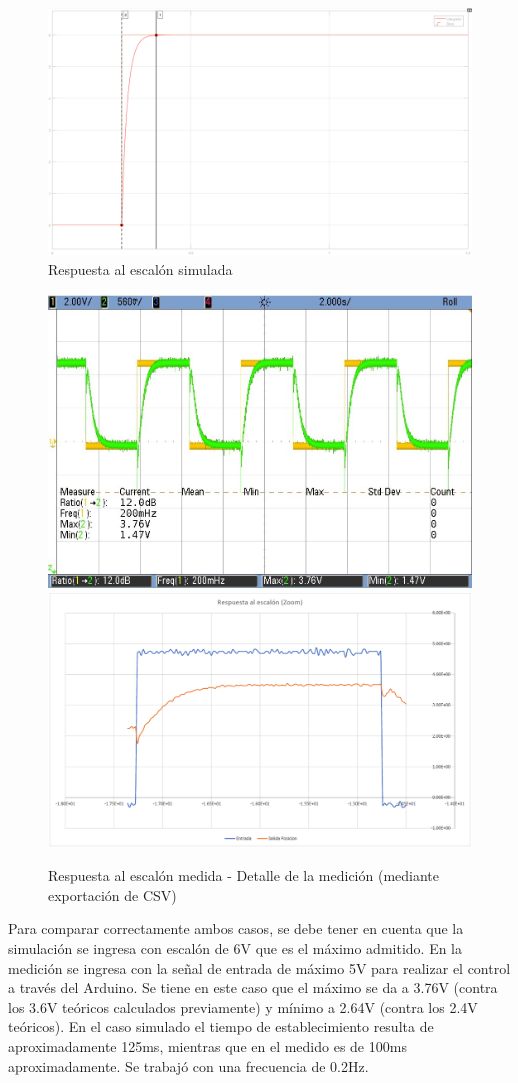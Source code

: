 \documentclass{article}
\begin{document}
\begin{figure}[H]
\centering
\includegraphics[width=0.6\linewidth]{../Images/EscalonSimulado.png}
\caption{Respuesta al escalón simulada}
\end{figure}

\begin{figure}[H]
\centering
\includegraphics[width=0.45\linewidth]{../Mediciones/servo_cuadrada.jpeg}
\includegraphics[width=0.45\linewidth]{../Images/EscalonMedido.png}
\caption{Respuesta al escalón medida - Detalle de la medición (mediante exportación de CSV)}
\end{figure}

Para comparar correctamente ambos casos, se debe tener en cuenta que la simulación se ingresa con escalón de 6V que es el máximo admitido. En la medición se ingresa con la señal de entrada de máximo 5V para realizar el control a través del Arduino. Se tiene en este caso que el máximo se da a 3.76V (contra los 3.6V teóricos calculados previamente) y mínimo a 2.64V (contra los 2.4V teóricos). En el caso simulado el tiempo de establecimiento resulta de aproximadamente 125ms, mientras que en el medido es de 100ms aproximadamente. Se trabajó con una frecuencia de 0.2Hz.

\newpage
\end{document}
